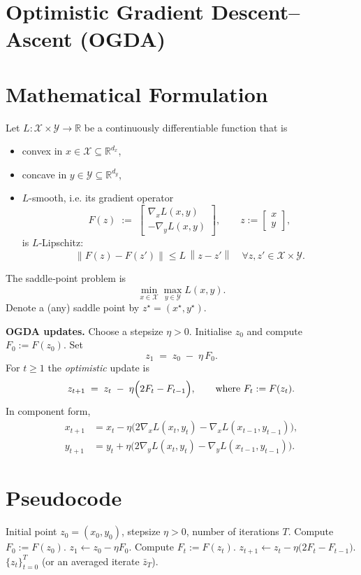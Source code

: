 \documentclass{article}
\newcommand{\R}{\mathbb{R}}
\newcommand{\norm}[1]{\left\|#1\right\|}
\begin{document}
\section*{Optimistic Gradient Descent–Ascent (OGDA)}

\section*{Mathematical Formulation}
Let $L:\mathcal X\times\mathcal Y\rightarrow\mathbb R$ be a continuously differentiable function that is
\begin{itemize}
    \item convex in $x\in\mathcal X\subseteq\R^{d_x}$,
    \item concave in $y\in\mathcal Y\subseteq\R^{d_y}$,
    \item $L$-smooth, i.e. its gradient operator 
    \[
        F(z)\;:=\;\begin{bmatrix}
            \nabla_x L(x,y)\\[2mm]
            -\nabla_y L(x,y)
        \end{bmatrix},\qquad z:=\begin{bmatrix}x\\y\end{bmatrix},
    \]
    is $L$‑Lipschitz:
    \[
        \norm{F(z)-F(z')}\le L\,\norm{z-z'}\quad\forall z,z'\in\mathcal X\times\mathcal Y .
    \]
\end{itemize}
The saddle‑point problem is
\[
    \min_{x\in\mathcal X}\max_{y\in\mathcal Y}L(x,y).
\]
Denote a (any) saddle point by $z^\star=(x^\star,y^\star)$.  

\bigskip
\noindent\textbf{OGDA updates.}  
Choose a stepsize $\eta>0$. Initialise $z_0$ and compute $F_0:=F(z_0)$.  Set
\[
    z_1 \;=\; z_0 \;-\; \eta\,F_0 .
\]
For $t\ge 1$ the \emph{optimistic} update is
\begin{equation}
\label{eq:ogda}
    z_{t+1}\;=\;z_t\;-\;\eta\Bigl(2F_t-F_{t-1}\Bigr),
\qquad\text{where }F_t:=F(z_t).
\end{equation}
In component form,
\[
\begin{aligned}
x_{t+1}&=x_t-\eta\bigl(2\nabla_x L(x_t,y_t)-\nabla_x L(x_{t-1},y_{t-1})\bigr),\\[1mm]
y_{t+1}&=y_t+\eta\bigl(2\nabla_y L(x_t,y_t)-\nabla_y L(x_{t-1},y_{t-1})\bigr).
\end{aligned}
\]

\section*{Pseudocode}
\begin{algorithm}[H]
\caption{Optimistic Gradient Descent–Ascent (OGDA)}
\begin{algorithmic}[1]
\REQUIRE Initial point $z_0=(x_0,y_0)$, stepsize $\eta>0$, number of iterations $T$.
\STATE Compute $F_0:=F(z_0)$.
\STATE $z_1 \leftarrow z_0-\eta F_0$.
    \STATE Compute $F_t:=F(z_t)$.
    \STATE $z_{t+1}\leftarrow z_t-\eta\bigl(2F_t-F_{t-1}\bigr)$.
\ENDFOR
\RETURN $\{z_t\}_{t=0}^{T}$ (or an averaged iterate $\bar z_T$).
\end{algorithmic}
\end{algorithm}
\end{document}
